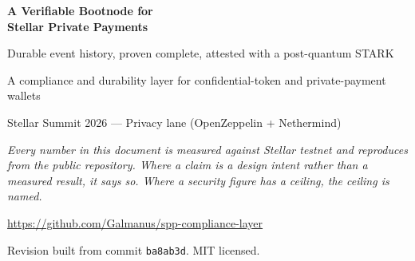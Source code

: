 \documentclass[11pt]{article}
\begin{document}
\begin{titlepage}
\centering
\vspace*{2.5cm}
{\Huge\bfseries\color{ink} A Verifiable Bootnode for\\[0.3cm] Stellar Private Payments\par}
\vspace{0.8cm}
{\large\color{klein} Durable event history, proven complete, attested with a post-quantum STARK\par}
\vspace{1.6cm}
{\large A compliance and durability layer for confidential-token and private-payment wallets\par}
\vspace{0.4cm}
{\normalsize Stellar Summit 2026 --- Privacy lane (OpenZeppelin + Nethermind)\par}
\vspace{2.2cm}
\begin{minipage}{0.82\textwidth}
\centering\small\itshape
Every number in this document is measured against Stellar testnet and reproduces
from the public repository. Where a claim is a design intent rather than a
measured result, it says so. Where a security figure has a ceiling, the ceiling
is named.
\end{minipage}
\vfill
{\small \url{https://github.com/Galmanus/spp-compliance-layer}\par}
\vspace{0.3cm}
{\footnotesize Revision built from commit \texttt{ba8ab3d}. MIT licensed.\par}
\end{titlepage}
\end{document}
